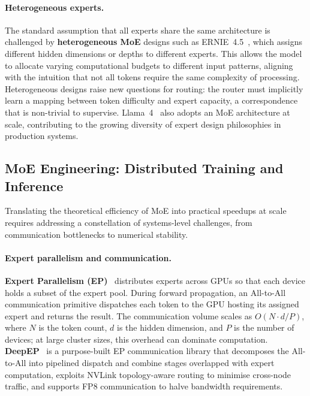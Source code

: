 \paragraph{Heterogeneous experts.}
The standard assumption that all experts share the same architecture is challenged by \textbf{heterogeneous MoE} designs such as ERNIE~4.5~\cite{ernie45_2025}, which assigns different hidden dimensions or depths to different experts.
This allows the model to allocate varying computational budgets to different input patterns, aligning with the intuition that not all tokens require the same complexity of processing.
Heterogeneous designs raise new questions for routing: the router must implicitly learn a mapping between token difficulty and expert capacity, a correspondence that is non-trivial to supervise.
Llama~4~\cite{meta2025llama4} also adopts an MoE architecture at scale, contributing to the growing diversity of expert design philosophies in production systems.


\subsection{MoE Engineering: Distributed Training and Inference}
\label{subsec:moe_engineering}

Translating the theoretical efficiency of MoE into practical speedups at scale requires addressing a constellation of systems-level challenges, from communication bottlenecks to numerical stability.

\paragraph{Expert parallelism and communication.}
\textbf{Expert Parallelism (EP)}~\cite{lepikhin2020gshard} distributes experts across GPUs so that each device holds a subset of the expert pool.
During forward propagation, an All-to-All communication primitive dispatches each token to the GPU hosting its assigned expert and returns the result.
The communication volume scales as $O(N \cdot d / P)$, where $N$ is the token count, $d$ is the hidden dimension, and $P$ is the number of devices; at large cluster sizes, this overhead can dominate computation.
\textbf{DeepEP}~\cite{deepseek2025deepep} is a purpose-built EP communication library that decomposes the All-to-All into pipelined dispatch and combine stages overlapped with expert computation, exploits NVLink topology-aware routing to minimise cross-node traffic, and supports FP8 communication to halve bandwidth requirements.

